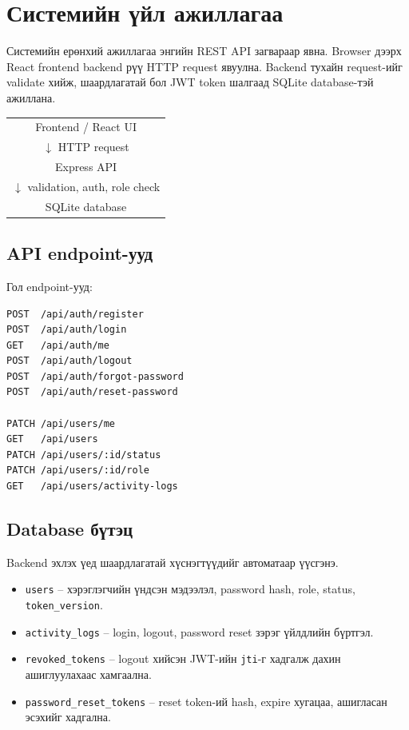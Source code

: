 \documentclass[12pt,a4paper]{article}
\begin{document}
\section{Системийн үйл ажиллагаа}

Системийн ерөнхий ажиллагаа энгийн REST API загвараар явна. Browser дээрх React frontend backend рүү HTTP request явуулна. Backend тухайн request-ийг validate хийж, шаардлагатай бол JWT token шалгаад SQLite database-тэй ажиллана.

\begin{center}
\begin{tabular}{c}
Frontend / React UI \\
$\downarrow$ HTTP request \\
Express API \\
$\downarrow$ validation, auth, role check \\
SQLite database
\end{tabular}
\end{center}

\subsection{API endpoint-ууд}

Гол endpoint-ууд:

\begin{lstlisting}[style=api]
POST  /api/auth/register
POST  /api/auth/login
GET   /api/auth/me
POST  /api/auth/logout
POST  /api/auth/forgot-password
POST  /api/auth/reset-password

PATCH /api/users/me
GET   /api/users
PATCH /api/users/:id/status
PATCH /api/users/:id/role
GET   /api/users/activity-logs
\end{lstlisting}

\subsection{Database бүтэц}

Backend эхлэх үед шаардлагатай хүснэгтүүдийг автоматаар үүсгэнэ.

\begin{itemize}
  \item \texttt{users} -- хэрэглэгчийн үндсэн мэдээлэл, password hash, role, status, \texttt{token\_version}.
  \item \texttt{activity\_logs} -- login, logout, password reset зэрэг үйлдлийн бүртгэл.
  \item \texttt{revoked\_tokens} -- logout хийсэн JWT-ийн \texttt{jti}-г хадгалж дахин ашиглуулахаас хамгаална.
  \item \texttt{password\_reset\_tokens} -- reset token-ий hash, expire хугацаа, ашигласан эсэхийг хадгална.
\end{itemize}
\end{document}
